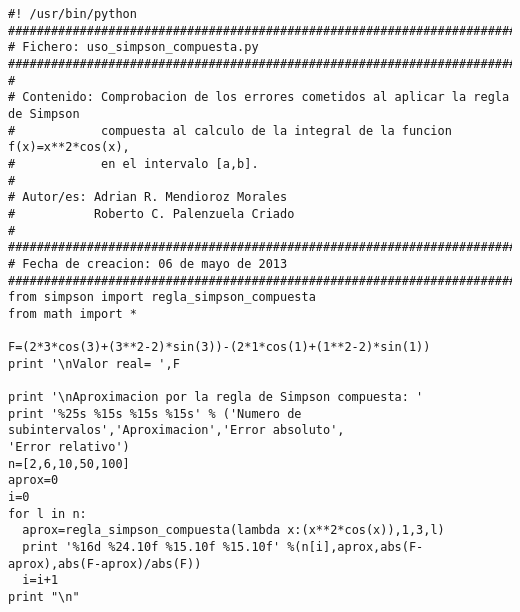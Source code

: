 \begin{center}
\begin{footnotesize}
\begin{verbatim}
#! /usr/bin/python
###################################################################################
# Fichero: uso_simpson_compuesta.py
###################################################################################
#
# Contenido: Comprobacion de los errores cometidos al aplicar la regla de Simpson
#            compuesta al calculo de la integral de la funcion f(x)=x**2*cos(x), 
#            en el intervalo [a,b].
#
# Autor/es: Adrian R. Mendioroz Morales
#           Roberto C. Palenzuela Criado
#
###################################################################################
# Fecha de creacion: 06 de mayo de 2013 
###################################################################################
from simpson import regla_simpson_compuesta
from math import *

F=(2*3*cos(3)+(3**2-2)*sin(3))-(2*1*cos(1)+(1**2-2)*sin(1))
print '\nValor real= ',F

print '\nAproximacion por la regla de Simpson compuesta: '
print '%25s %15s %15s %15s' % ('Numero de subintervalos','Aproximacion','Error absoluto',
'Error relativo')
n=[2,6,10,50,100]
aprox=0
i=0
for l in n:
  aprox=regla_simpson_compuesta(lambda x:(x**2*cos(x)),1,3,l)
  print '%16d %24.10f %15.10f %15.10f' %(n[i],aprox,abs(F-aprox),abs(F-aprox)/abs(F))
  i=i+1
print "\n"
\end{verbatim}
\end{footnotesize}
\end{center}
